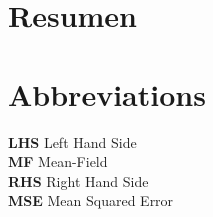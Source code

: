 \documentclass[openany]{article}
\begin{document}
\section*{Resumen}

    \lipsum[1]
    
%

\clearpage\thispagestyle{empty}\null\newpage %

\newpage
\thispagestyle{plain}

\section*{Abbreviations}

\textbf{LHS} Left Hand Side \\

\textbf{MF} Mean-Field \\

\textbf{RHS} Right Hand Side \\

\textbf{MSE} Mean Squared Error

\clearpage\thispagestyle{empty}\null\newpage %

\newpage
\thispagestyle{plain}
{
\hypersetup{hidelinks}
\tableofcontents
}


\thispagestyle{empty}

\clearpage\thispagestyle{empty}\null\newpage %


\newpage


\newpage


\newpage


\newpage


\newpage


\newpage


\newpage


\newpage


\newpage

\end{document}
